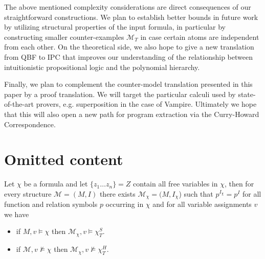 \documentclass[a4paper,UKenglish,cleveref, autoref, thm-restate]{lipics-v2021}
\begin{document}
The above mentioned complexity considerations are direct consequences of our straightforward constructions.
We plan to establish better bounds in future work by utilizing structural properties of the input formula, in particular by constructing smaller counter-examples $\mathcal M_T$ in case certain atoms are independent from each other.
On the theoretical side, we also hope to give a new translation from QBF to IPC that improves our understanding of the relationship between intuitionistic propositional logic and the polynomial hierarchy.

Finally, we plan to complement the counter-model translation presented in this paper by a proof translation.
We will target the particular calculi used by state-of-the-art provers, e.g. superposition in the case of Vampire. Ultimately we hope that this will also open a new path for program extraction via the Curry-Howard Correspondence.



\appendix

\section{Omitted content}

\begin{lemma}\label{ap1}
Let $\chi$ be a formula and let $\{z_1\dots z_n\} = Z$ contain all free variables in $\chi$, then for every structure $\mathcal M = (M, I)$ there exists $\mathcal M_\chi = (M, I_\chi$) such that $p^{I_{\chi}} = p^I$ for all function and relation symbols $p$ occurring in $\chi$ and for all variable assignments $v$ we have
	\begin{itemize}
		\item if $M, v \models\chi$ then $\mathcal M_\chi, v\models\chi^S_T$.
		\item if $\mathcal M, v\not\models\chi$ then $\mathcal M_\chi, v\not\models\chi^H_T$.
	\end{itemize}
\end{lemma}
\end{document}
